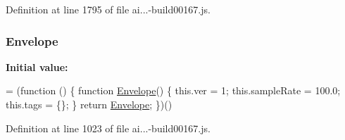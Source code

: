 Definition at line 1795 of file ai...-\/build00167.\+js.

\subsubsection[{\texorpdfstring{Envelope}{Envelope}}]{ Envelope}\hypertarget{obj_2_release_2_package_2_package_tmp_2_scripts_2ai_80_822_89-build00167_8js_a9823f9c23669cb68ab0acbfa8d2180a7}{}\label{obj_2_release_2_package_2_package_tmp_2_scripts_2ai_80_822_89-build00167_8js_a9823f9c23669cb68ab0acbfa8d2180a7}
{\bfseries Initial value\+:}
\begin{DoxyCode}
= (\textcolor{keyword}{function} () \{
            \textcolor{keyword}{function} \hyperlink{obj_2_release_2_package_2_package_tmp_2_scripts_2ai_80_822_89-build00167_8js_a9823f9c23669cb68ab0acbfa8d2180a7}{Envelope}() \{
                this.ver = 1;
                this.sampleRate = 100.0;
                this.tags = \{\};
            \}
            \textcolor{keywordflow}{return} \hyperlink{obj_2_release_2_package_2_package_tmp_2_scripts_2ai_80_822_89-build00167_8js_a9823f9c23669cb68ab0acbfa8d2180a7}{Envelope};
        \})()
\end{DoxyCode}


Definition at line 1023 of file ai...-\/build00167.\+js.

